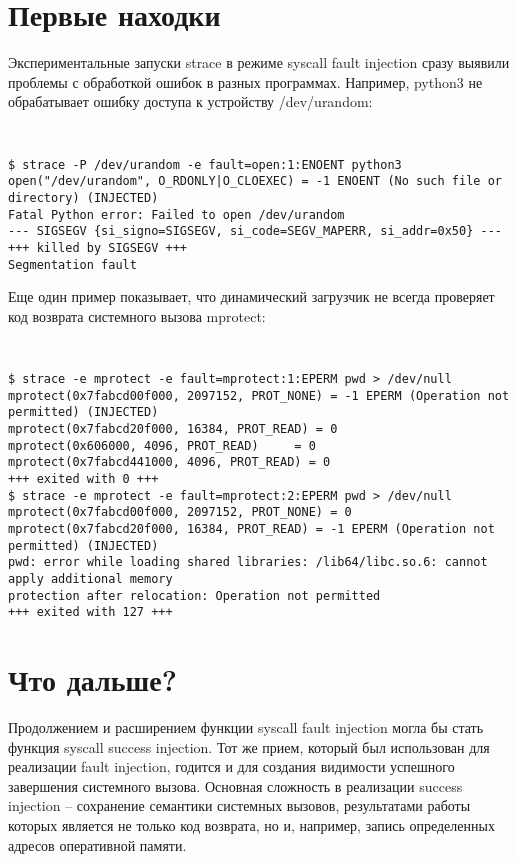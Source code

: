\section{Первые находки}

Экспериментальные запуски strace в режиме syscall fault injection сразу
выявили проблемы с обработкой ошибок в разных программах.  Например,
python3 не обрабатывает ошибку доступа к устройству /dev/urandom:
{\tt\tiny
\begin{verbatim}
$ strace -P /dev/urandom -e fault=open:1:ENOENT python3
open("/dev/urandom", O_RDONLY|O_CLOEXEC) = -1 ENOENT (No such file or directory) (INJECTED)
Fatal Python error: Failed to open /dev/urandom
--- SIGSEGV {si_signo=SIGSEGV, si_code=SEGV_MAPERR, si_addr=0x50} ---
+++ killed by SIGSEGV +++
Segmentation fault
\end{verbatim}
}

Еще один пример показывает, что динамический загрузчик не всегда
проверяет код возврата системного вызова mprotect:
{\tt\tiny
\begin{verbatim}
$ strace -e mprotect -e fault=mprotect:1:EPERM pwd > /dev/null
mprotect(0x7fabcd00f000, 2097152, PROT_NONE) = -1 EPERM (Operation not permitted) (INJECTED)
mprotect(0x7fabcd20f000, 16384, PROT_READ) = 0
mprotect(0x606000, 4096, PROT_READ)     = 0
mprotect(0x7fabcd441000, 4096, PROT_READ) = 0
+++ exited with 0 +++
$ strace -e mprotect -e fault=mprotect:2:EPERM pwd > /dev/null
mprotect(0x7fabcd00f000, 2097152, PROT_NONE) = 0
mprotect(0x7fabcd20f000, 16384, PROT_READ) = -1 EPERM (Operation not permitted) (INJECTED)
pwd: error while loading shared libraries: /lib64/libc.so.6: cannot apply additional memory
protection after relocation: Operation not permitted
+++ exited with 127 +++
\end{verbatim}
}

\section{Что дальше?}

Продолжением и расширением функции syscall fault injection могла бы
стать функция syscall success injection.  Тот же прием, который был
использован для реализации fault injection, годится и для создания
видимости успешного завершения системного вызова.  Основная сложность в
реализации success injection -- сохранение семантики системных вызовов,
результатами работы которых является не только код возврата, но и,
например, запись определенных адресов оперативной памяти.


